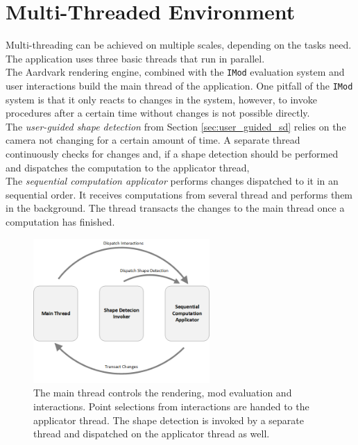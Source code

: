 \section{Multi-Threaded Environment}

Multi-threading can be achieved on multiple scales, depending on the tasks need. The application uses three basic threads that run in parallel. 
\\
The Aardvark rendering engine, combined with the \verb|IMod| evaluation system and user interactions build the main thread of the application. One pitfall of the \verb|IMod| system is that it only reacts to changes in the system, however, to invoke procedures after a certain time without changes is not possible directly. 
\\


The \textit{user-guided shape detection} from Section \ref{sec:user_guided_sd} relies on the camera not changing for a certain amount of time. 
A separate thread continuously checks for changes and, if a shape detection should be performed and dispatches the computation to the applicator thread, 
\\
The \textit{sequential computation applicator} performs changes dispatched to it in an sequential order. It receives computations from several thread and performs them in the background. The thread transacts the changes to the main thread once a computation has finished. 

\begin{figure}
    \centering
    \includegraphics[width=0.6\textwidth]{Implementation/multiThreading.png}
    \caption{The main thread controls the rendering, mod evaluation and interactions. Point selections from interactions are handed to the applicator thread. The shape detection is invoked by a separate thread and dispatched on the applicator thread as well.  }
    \label{fig:multiThreading}
\end{figure}

